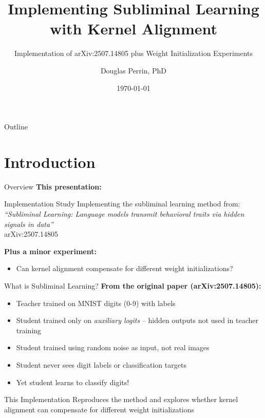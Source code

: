 \documentclass{beamer}
\title[Subliminal Learning]{Implementing Subliminal Learning with Kernel Alignment}
\subtitle{Implementation of arXiv:2507.14805 plus Weight Initialization Experiments}
\author{Douglas Perrin, PhD}
\institute{Group Presentation}
\date{\today}
\begin{document}
\frame{\titlepage}

\begin{frame}{Outline}
\tableofcontents
\end{frame}

\section{Introduction}

\begin{frame}{Overview}
\textbf{This presentation:}

\vspace{1em}

\begin{block}{Implementation Study}
Implementing the subliminal learning method from:\\
\textit{``Subliminal Learning: Language models transmit behavioral traits via hidden signals in data''}\\
arXiv:2507.14805
\end{block}

\vspace{1em}

\textbf{Plus a minor experiment:}
\begin{itemize}
    \item Can kernel alignment compensate for different weight initializations?
\end{itemize}

\end{frame}

\begin{frame}{What is Subliminal Learning?}
\textbf{From the original paper (arXiv:2507.14805):}

\vspace{1em}

\begin{itemize}
    \item Teacher trained on MNIST digits (0-9) with labels
    \item Student trained only on \emph{auxiliary logits} -- hidden outputs not used in teacher training
    \item \alert{Student trained using random noise as input, not real images}
    \item Student never sees digit labels or classification targets
    \item Yet student learns to classify digits!
\end{itemize}

\vspace{1em}

\pause
\begin{block}{This Implementation}
Reproduces the method and explores whether kernel alignment can compensate for different weight initializations
\end{block}

\end{frame}
\end{document}
